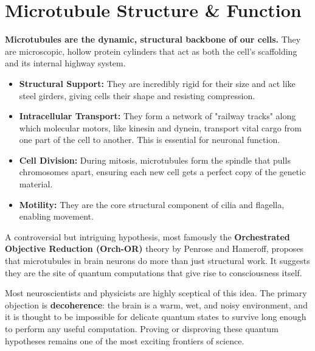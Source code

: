 
\chapter{Microtubule Structure \& Function}
\label{ch:microtubules}

\begin{nontechnical}
    \textbf{Microtubules are the dynamic, structural backbone of our cells.} They are microscopic, hollow protein cylinders that act as both the cell's scaffolding and its internal highway system.

    \begin{itemize}
        \item \textbf{Structural Support:} They are incredibly rigid for their size and act like steel girders, giving cells their shape and resisting compression.
        \item \textbf{Intracellular Transport:} They form a network of "railway tracks" along which molecular motors, like kinesin and dynein, transport vital cargo from one part of the cell to another. This is essential for neuronal function.
        \item \textbf{Cell Division:} During mitosis, microtubules form the spindle that pulls chromosomes apart, ensuring each new cell gets a perfect copy of the genetic material.
        \item \textbf{Motility:} They are the core structural component of cilia and flagella, enabling movement.
    \end{itemize}

    A controversial but intriguing hypothesis, most famously the \textbf{Orchestrated Objective Reduction (Orch-OR)} theory by Penrose and Hameroff, proposes that microtubules in brain neurons do more than just structural work. It suggests they are the site of quantum computations that give rise to consciousness itself.

    Most neuroscientists and physicists are highly sceptical of this idea. The primary objection is \textbf{decoherence}: the brain is a warm, wet, and noisy environment, and it is thought to be impossible for delicate quantum states to survive long enough to perform any useful computation. Proving or disproving these quantum hypotheses remains one of the most exciting frontiers of science.
\end{nontechnical}



